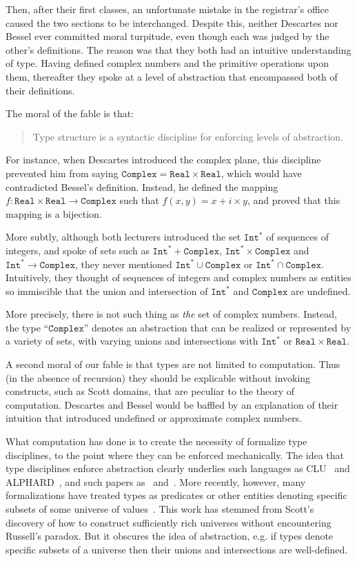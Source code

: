 \documentclass[sigplan,screen,nonacm,balance=false]{acmart}
\makeatletter
\theoremstyle{plain}
\newcommand{\eg}{e.g.\@\xspace}
\newcommand{\Real}{\mathtt{Real}}
\newcommand{\Complex}{\mathtt{Complex}}
\newcommand{\Int}{\mathtt{Int}}
\makeatother
\begin{document}
Then, after their first classes, an unfortunate mistake in the registrar's office caused the two sections to be interchanged.
Despite this, neither Descartes nor Bessel ever committed moral turpitude, even though each was judged by the other's definitions.
The reason was that they both had an intuitive understanding of type.
Having defined complex numbers and the primitive operations upon them, thereafter they spoke at a level of abstraction that encompassed both of their definitions.

The moral of the fable is that:

\begin{quote}
  Type structure is a syntactic discipline for enforcing levels of abstraction.
\end{quote}

For instance, when Descartes introduced the complex plane, this discipline prevented him from saying 
$\Complex = \Real \times \Real$,
which would have contradicted Bessel's definition.
Instead, he defined the mapping
$f : \Real \times \Real \to \Complex$ such that $f(x, y) = x + i \times y$,
and proved that this mapping is a bijection.

More subtly, although both lecturers introduced the set $\Int^*$ of sequences of integers, and spoke of sets such as $\Int^* + \Complex$, $\Int^* \times \Complex$ and $\Int^* \to \Complex$, they never mentioned $\Int^* \cup \Complex$ or $\Int^* \cap \Complex$.
Intuitively, they thought of sequences of integers and complex numbers as entities so immiscible that the union and intersection of $\Int^*$ and $\Complex$ are undefined.

More precisely, there is not such thing as \emph{the} set of complex numbers.
Instead, the type ``$\Complex$'' denotes an abstraction that can be realized or represented by a variety of sets, with varying unions and intersections with $\Int^*$ or $\Real \times \Real$.

A second moral of our fable is that types are not limited to computation.
Thus (in the absence of recursion) they should be explicable without invoking constructs, such as Scott domains, that are peculiar to the theory of computation.
Descartes and Bessel would be baffled by an explanation of their intuition that introduced undefined or approximate complex numbers.

What computation has done is to create the necessity of formalize type disciplines, to the point where they can be enforced mechanically.
The idea that type disciplines enforce abstraction clearly underlies such languages as CLU~\citep{CLU} and ALPHARD~\citep{Alphard}, and such papers as~\citep{not-sets} and~\citep{polymorphism}.
More recently, however, many formalizations have treated types as predicates or other entities denoting specific subsets of some universe of values~\citep{polytype,retract,applicative,repindep,polydata}.
This work has stemmed from Scott's discovery of how to construct sufficiently rich universes without encountering Russell's paradox.
But it obscures the idea of abstraction, \eg if types denote specific subsets of a universe then their unions and intersections are well-defined.
\end{document}
